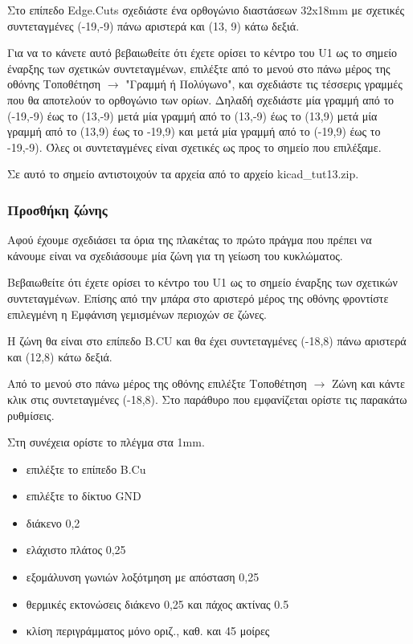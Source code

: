 \documentclass[a4paper]{article}
\begin{document}
Στο επίπεδο Edge.Cuts σχεδιάστε ένα ορθογώνιο διαστάσεων 32x18mm με σχετικές συντεταγμένες (-19,-9) πάνω αριστερά και (13, 9) κάτω δεξιά. 

Για να το κάνετε αυτό βεβαιωθείτε ότι έχετε ορίσει το κέντρο του U1  ως το σημείο έναρξης των σχετικών συντεταγμένων, επιλέξτε από το μενού στο πάνω μέρος της οθόνης Τοποθέτηση $\rightarrow$ "Γραμμή ή Πολύγωνο", και σχεδιάστε τις τέσσερις γραμμές που θα αποτελούν το ορθογώνιο των ορίων. Δηλαδή σχεδιάστε μία γραμμή από το (-19,-9) έως το (13,-9) μετά μία γραμμή από το (13,-9) έως το (13,9) μετά μία γραμμή από το (13,9) έως το -19,9) και μετά μία γραμμή από το (-19,9) έως το -19,-9). Όλες οι συντεταγμένες είναι σχετικές ως προς το σημείο που επιλέξαμε.

Σε αυτό το σημείο αντιστοιχούν τα αρχεία από το αρχείο kicad\_tut13.zip.

\subsubsection{Προσθήκη ζώνης}
Αφού έχουμε σχεδιάσει τα όρια της πλακέτας το πρώτο πράγμα που πρέπει να κάνουμε είναι να σχεδιάσουμε μία ζώνη για τη γείωση του κυκλώματος. 

Βεβαιωθείτε ότι έχετε ορίσει το κέντρο του U1  ως το σημείο έναρξης των σχετικών συντεταγμένων. Επίσης από την μπάρα στο αριστερό μέρος της οθόνης φροντίστε επιλεγμένη η Εμφάνιση γεμισμένων περιοχών σε ζώνες. %

Η ζώνη θα είναι στο επίπεδο B.CU και θα έχει συντεταγμένες (-18,8) πάνω αριστερά και (12,8) κάτω δεξιά. %

Από το μενού στο πάνω μέρος της οθόνης επιλέξτε Τοποθέτηση $\rightarrow$ Ζώνη και κάντε κλικ στις συντεταγμένες (-18,8). Στο παράθυρο που εμφανίζεται ορίστε τις παρακάτω ρυθμίσεις.


Στη συνέχεια ορίστε το πλέγμα στα 1mm.

\begin{itemize}
    \item επιλέξτε το επίπεδο B.Cu
    \item επιλέξτε το δίκτυο GND
    \item διάκενο 0,2
    \item ελάχιστο πλάτος 0,25
    \item εξομάλυνση γωνιών λοξότμηση με απόσταση 0,25
    \item θερμικές εκτονώσεις διάκενο 0,25 και πάχος ακτίνας 0.5
    \item κλίση περιγράμματος μόνο οριζ., καθ. και 45 μοίρες
\end{itemize}
\end{document}
